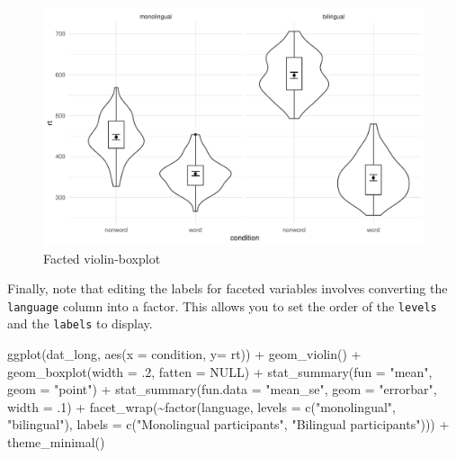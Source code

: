 \documentclass[
  english,
  doc,floatsintext]{apa6}
\newenvironment{Shaded}{\begin{snugshade}}{\end{snugshade}}
\newcommand{\AttributeTok}[1]{\textcolor[rgb]{0.77,0.63,0.00}{#1}}
\newcommand{\ConstantTok}[1]{\textcolor[rgb]{0.00,0.00,0.00}{#1}}
\newcommand{\DecValTok}[1]{\textcolor[rgb]{0.00,0.00,0.81}{#1}}
\newcommand{\FunctionTok}[1]{\textcolor[rgb]{0.00,0.00,0.00}{#1}}
\newcommand{\NormalTok}[1]{#1}
\newcommand{\SpecialCharTok}[1]{\textcolor[rgb]{0.00,0.00,0.00}{#1}}
\newcommand{\StringTok}[1]{\textcolor[rgb]{0.31,0.60,0.02}{#1}}
\begin{document}
\begin{figure}

{\centering \includegraphics[width=1\linewidth]{images/violin-boxplot-facet-1} 

}

\caption{Facted violin-boxplot}\label{fig:violin-boxplot-facet}
\end{figure}

Finally, note that editing the labels for faceted variables involves converting the \texttt{language} column into a factor. This allows you to set the order of the \texttt{levels} and the \texttt{labels} to display.

\begin{Shaded}
\begin{Highlighting}[]
\FunctionTok{ggplot}\NormalTok{(dat\_long, }\FunctionTok{aes}\NormalTok{(}\AttributeTok{x =}\NormalTok{ condition, }\AttributeTok{y=}\NormalTok{ rt)) }\SpecialCharTok{+}
  \FunctionTok{geom\_violin}\NormalTok{() }\SpecialCharTok{+}
  \FunctionTok{geom\_boxplot}\NormalTok{(}\AttributeTok{width =}\NormalTok{ .}\DecValTok{2}\NormalTok{, }\AttributeTok{fatten =} \ConstantTok{NULL}\NormalTok{) }\SpecialCharTok{+}
  \FunctionTok{stat\_summary}\NormalTok{(}\AttributeTok{fun =} \StringTok{"mean"}\NormalTok{, }\AttributeTok{geom =} \StringTok{"point"}\NormalTok{) }\SpecialCharTok{+}
  \FunctionTok{stat\_summary}\NormalTok{(}\AttributeTok{fun.data =} \StringTok{"mean\_se"}\NormalTok{, }\AttributeTok{geom =} \StringTok{"errorbar"}\NormalTok{, }\AttributeTok{width =}\NormalTok{ .}\DecValTok{1}\NormalTok{) }\SpecialCharTok{+}
  \FunctionTok{facet\_wrap}\NormalTok{(}\SpecialCharTok{\textasciitilde{}}\FunctionTok{factor}\NormalTok{(language, }
                     \AttributeTok{levels =} \FunctionTok{c}\NormalTok{(}\StringTok{"monolingual"}\NormalTok{, }\StringTok{"bilingual"}\NormalTok{),}
                     \AttributeTok{labels =} \FunctionTok{c}\NormalTok{(}\StringTok{"Monolingual participants"}\NormalTok{, }
                                \StringTok{"Bilingual participants"}\NormalTok{))) }\SpecialCharTok{+}
  \FunctionTok{theme\_minimal}\NormalTok{()}
\end{Highlighting}
\end{Shaded}
\end{document}
